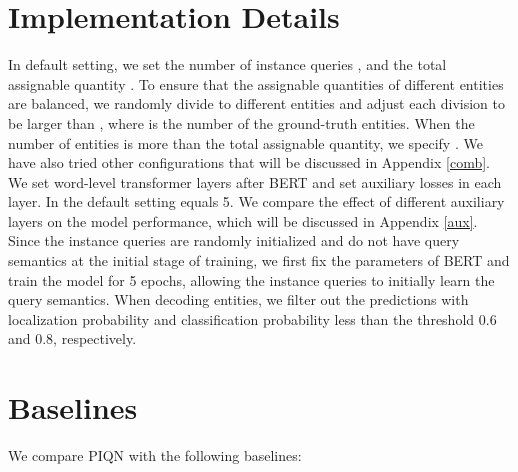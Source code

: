 \documentclass[11pt]{article}
\begin{document}
\section{Implementation Details}

\label{app:id}

In default setting, we set the number of instance queries , and the total assignable quantity . 
To ensure that the assignable quantities of different entities are balanced, we randomly divide  to different entities and adjust each division to be larger than , where  is the number of the ground-truth entities.
When the number of entities is more than the total assignable quantity, we specify . We have also tried other configurations that will be discussed in Appendix \ref{comb}.
We set  word-level transformer layers after BERT and set auxiliary losses in each layer. In the default setting  equals 5.
We compare the effect of different auxiliary layers on the model performance, which will be discussed in Appendix \ref{aux}. Since the instance queries are randomly initialized and do not have query semantics at the initial stage of training, we first fix the parameters of BERT and train the model for 5 epochs, allowing the instance queries to initially learn the query semantics. When decoding entities, we filter out the predictions with localization probability and classification probability less than the threshold 0.6 and 0.8, respectively.






\section{Baselines}
\label{app:baseline}
We compare PIQN with the following baselines:
\end{document}
